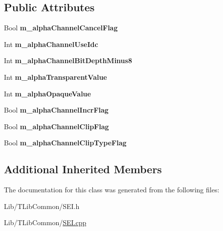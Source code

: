 \subsection*{Public Attributes}
\begin{DoxyCompactItemize}
\item 
\mbox{\label{class_s_e_i_alpha_channel_info_ab8ab79f115aca8c954c165931a248c08}} 
Bool {\bfseries m\+\_\+alpha\+Channel\+Cancel\+Flag}
\item 
\mbox{\label{class_s_e_i_alpha_channel_info_adae93659cc43908ccf56b0c82ede6f3a}} 
Int {\bfseries m\+\_\+alpha\+Channel\+Use\+Idc}
\item 
\mbox{\label{class_s_e_i_alpha_channel_info_aad23c96fe7a271d0470892dc0ca8763d}} 
Int {\bfseries m\+\_\+alpha\+Channel\+Bit\+Depth\+Minus8}
\item 
\mbox{\label{class_s_e_i_alpha_channel_info_a4371d87fa335ee6ecd9fbc0c7f8c4a3d}} 
Int {\bfseries m\+\_\+alpha\+Transparent\+Value}
\item 
\mbox{\label{class_s_e_i_alpha_channel_info_a7f41cb23dee8210fc9107415532bdde6}} 
Int {\bfseries m\+\_\+alpha\+Opaque\+Value}
\item 
\mbox{\label{class_s_e_i_alpha_channel_info_af34f9ce1cf442d2c46e00a7b65d15d9d}} 
Bool {\bfseries m\+\_\+alpha\+Channel\+Incr\+Flag}
\item 
\mbox{\label{class_s_e_i_alpha_channel_info_ac75f1d152064a82da576029d459b732d}} 
Bool {\bfseries m\+\_\+alpha\+Channel\+Clip\+Flag}
\item 
\mbox{\label{class_s_e_i_alpha_channel_info_a3952ea4ccc534826039addd8605ebaea}} 
Bool {\bfseries m\+\_\+alpha\+Channel\+Clip\+Type\+Flag}
\end{DoxyCompactItemize}
\subsection*{Additional Inherited Members}


The documentation for this class was generated from the following files\+:\begin{DoxyCompactItemize}
\item 
Lib/\+T\+Lib\+Common/S\+E\+I.\+h\item 
Lib/\+T\+Lib\+Common/\hyperlink{_s_e_i_8cpp}{S\+E\+I.\+cpp}\end{DoxyCompactItemize}
